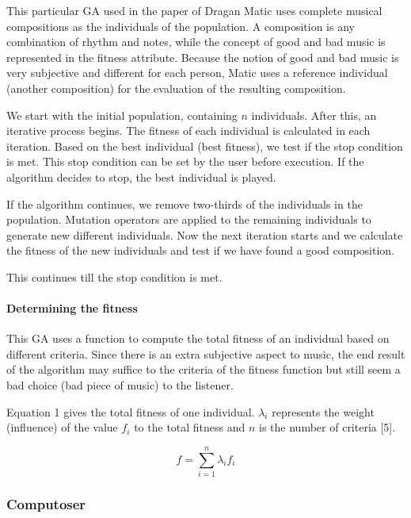 \documentclass[12pt]{article}
\begin{document}
This particular GA used in the paper of Dragan Matic uses complete musical compositions as the individuals of the population. A composition is any combination of rhythm and notes, while the concept of good and bad music is represented in the fitness attribute. Because the notion of good and bad music is very subjective and different for each person, Matic uses a reference individual (another composition) for the evaluation of the resulting composition.
\newline

We start with the initial population, containing $n$ individuals. After this, an iterative process begins. The fitness of each individual is calculated in each iteration. Based on the best individual (best fitness), we test if the stop condition is met. This stop condition can be set by the user before execution. If the algorithm decides to stop, the best individual is played.
\newline

If the algorithm continues, we remove two-thirds of the individuals in the population. Mutation operators are applied to the remaining individuals to generate new different individuals. Now the next iteration starts and we calculate the fitness of the new individuals and test if we have found a good composition.

This continues till the stop condition is met.

\paragraph{Determining the fitness}

This GA uses a function to compute the total fitness of an individual based on different criteria. Since there is an extra subjective aspect to music, the end result of the algorithm may suffice to the criteria of the fitness function but still seem a bad choice (bad piece of music) to the listener. 
\newline

Equation 1 gives the total fitness of one individual. $\lambda_i$ represents the weight (influence) of the value $f_i$ to the total fitness and $n$ is the number of criteria [5].

\begin{equation}
f = \sum_{i = 1}^{n}\lambda_i f_i
\end{equation}

\subsubsection{Computoser}
\end{document}

